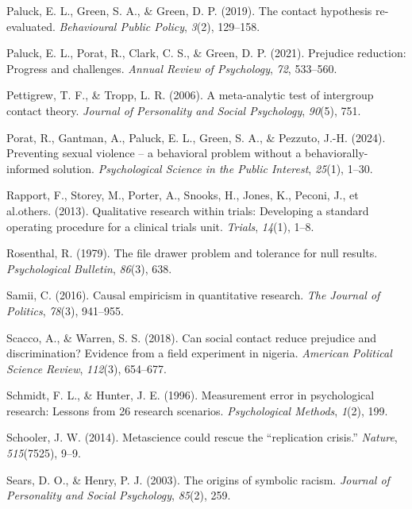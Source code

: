 \documentclass[
  ,jou]{apa6}
\newlength{\cslhangindent}
\newenvironment{CSLReferences}[2] %
 {\begin{list}{}{%
  \setlength{\itemindent}{0pt}
  \setlength{\leftmargin}{0pt}
  \setlength{\parsep}{0pt}
  \ifodd #1
   \setlength{\leftmargin}{\cslhangindent}
   \setlength{\itemindent}{-1\cslhangindent}
  \fi
  \setlength{\itemsep}{#2\baselineskip}}}
 {\end{list}}
\begin{document}
\begin{CSLReferences}{1}{0}
Paluck, E. L., Green, S. A., \& Green, D. P. (2019). The contact hypothesis re-evaluated. \emph{Behavioural Public Policy}, \emph{3}(2), 129--158.

Paluck, E. L., Porat, R., Clark, C. S., \& Green, D. P. (2021). Prejudice reduction: Progress and challenges. \emph{Annual Review of Psychology}, \emph{72}, 533--560.

Pettigrew, T. F., \& Tropp, L. R. (2006). A meta-analytic test of intergroup contact theory. \emph{Journal of Personality and Social Psychology}, \emph{90}(5), 751.

Porat, R., Gantman, A., Paluck, E. L., Green, S. A., \& Pezzuto, J.-H. (2024). Preventing sexual violence -- a behavioral problem without a behaviorally-informed solution. \emph{Psychological Science in the Public Interest}, \emph{25}(1), 1--30.

Rapport, F., Storey, M., Porter, A., Snooks, H., Jones, K., Peconi, J., et al.others. (2013). Qualitative research within trials: Developing a standard operating procedure for a clinical trials unit. \emph{Trials}, \emph{14}(1), 1--8.

Rosenthal, R. (1979). The file drawer problem and tolerance for null results. \emph{Psychological Bulletin}, \emph{86}(3), 638.

Samii, C. (2016). Causal empiricism in quantitative research. \emph{The Journal of Politics}, \emph{78}(3), 941--955.

Scacco, A., \& Warren, S. S. (2018). Can social contact reduce prejudice and discrimination? Evidence from a field experiment in nigeria. \emph{American Political Science Review}, \emph{112}(3), 654--677.

Schmidt, F. L., \& Hunter, J. E. (1996). Measurement error in psychological research: Lessons from 26 research scenarios. \emph{Psychological Methods}, \emph{1}(2), 199.

Schooler, J. W. (2014). Metascience could rescue the {``replication crisis.''} \emph{Nature}, \emph{515}(7525), 9--9.

Sears, D. O., \& Henry, P. J. (2003). The origins of symbolic racism. \emph{Journal of Personality and Social Psychology}, \emph{85}(2), 259.


\end{CSLReferences}
\end{document}

